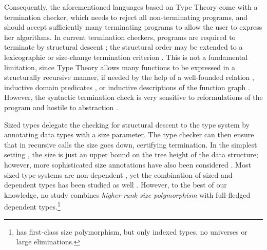 \documentclass[acmsmall,screen]{acmart}\settopmatter{}
\begin{document}
Consequently, the aforementioned languages based on Type Theory come with a termination checker, which needs to reject all non-terminating programs, and should accept sufficiently many terminating programs to allow the user to express her algorithms.  In current termination checkers, programs are required to terminate by structural descent \cite{gimenez:guardeddefinitions}; the structural order may be extended to a lexicographic \cite{abelAltenkirch:jfp02} or size-change termination criterion \cite{jones:sizeChange,wahlstedt:PhD}.  This is not a fundamental limitation, since Type Theory allows many functions to be expressed in a structurally recursive manner, if needed by the help of a well-founded relation \cite{nordstrom:genrec}, inductive domain predicates \cite{boveCapretta:mscs05}, or inductive descriptions of the function graph \cite{bove:entcs09}.  However, the syntactic termination check is very sensitive to reformulations of the program and hostile to abstraction \cite{abel:fics12}.

Sized types \cite{hughesParetoSabry:popl96} delegate the checking for structural descent to the type system by annotating data types with a size parameter.  The type checker can then ensure that in recursive calls the size goes down, certifying termination.  In the simplest setting \cite{gimenez:typeBased,abel:lmcs07}, the size is just an upper bound on the tree height of the data structure; however, more sophisticated size annotations have also been considered \cite{xi:terminationHOSC,blanqui:rta04}.  Most sized type systems are non-dependent \cite{amadio:guardcondition,abelPientka:jfp16,bartheGregoireRiba:lernet08,bartheGregoireRiba:csl08,blanquiRiba:lpar06,dalLagoGrellois:esop17}, yet the combination of sized and dependent types has been studied as well \cite{blanqui:csl05,bartheGregoirePastawski:lpar06,gregoireSacchini:lpar10,sacchini:lics13,sacchini:flops14}.  However, to the best of our knowledge, no study combines \emph{higher-rank size polymorphism} with full-fledged dependent types.\footnote{\citet{xi:terminationHOSC} has first-class size polymorphism, but only indexed types, no universes or large eliminations.}
\end{document}
